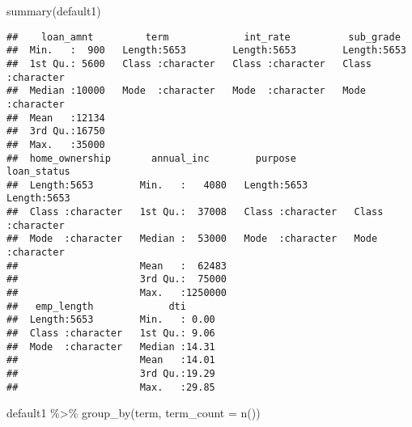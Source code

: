 \documentclass[
]{article}
\newenvironment{Shaded}{\begin{snugshade}}{\end{snugshade}}
\newcommand{\AttributeTok}[1]{\textcolor[rgb]{0.77,0.63,0.00}{#1}}
\newcommand{\FunctionTok}[1]{\textcolor[rgb]{0.00,0.00,0.00}{#1}}
\newcommand{\NormalTok}[1]{#1}
\newcommand{\SpecialCharTok}[1]{\textcolor[rgb]{0.00,0.00,0.00}{#1}}
\begin{document}
\begin{Shaded}
\begin{Highlighting}[]
\FunctionTok{summary}\NormalTok{(default1)}
\end{Highlighting}
\end{Shaded}

\begin{verbatim}
##    loan_amnt         term             int_rate          sub_grade        
##  Min.   :  900   Length:5653        Length:5653        Length:5653       
##  1st Qu.: 5600   Class :character   Class :character   Class :character  
##  Median :10000   Mode  :character   Mode  :character   Mode  :character  
##  Mean   :12134                                                           
##  3rd Qu.:16750                                                           
##  Max.   :35000                                                           
##  home_ownership       annual_inc        purpose          loan_status       
##  Length:5653        Min.   :   4080   Length:5653        Length:5653       
##  Class :character   1st Qu.:  37008   Class :character   Class :character  
##  Mode  :character   Median :  53000   Mode  :character   Mode  :character  
##                     Mean   :  62483                                        
##                     3rd Qu.:  75000                                        
##                     Max.   :1250000                                        
##   emp_length             dti       
##  Length:5653        Min.   : 0.00  
##  Class :character   1st Qu.: 9.06  
##  Mode  :character   Median :14.31  
##                     Mean   :14.01  
##                     3rd Qu.:19.29  
##                     Max.   :29.85
\end{verbatim}

\begin{Shaded}
\begin{Highlighting}[]
\NormalTok{default1 }\SpecialCharTok{\%\textgreater{}\%}
  \FunctionTok{group\_by}\NormalTok{(term, }\AttributeTok{term\_count =} \FunctionTok{n}\NormalTok{())}
\end{Highlighting}
\end{Shaded}
\end{document}
